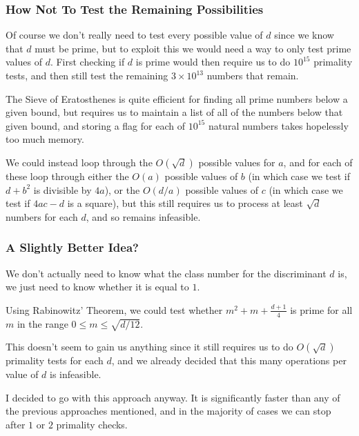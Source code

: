 \documentclass{beamer}
\begin{document}
\begin{frame}

	\frametitle{How Not To Test the Remaining Possibilities}

	Of course we don't really need to test every possible value of $d$ since we know that $d$ must be prime, but to exploit this we would need a way to only test prime values of $d$. First checking if $d$ is prime would then require us to do $10^{15}$ primality tests, and then still test the remaining $3 \times 10^{13}$ numbers that remain. \pause

	The Sieve of Eratosthenes is quite efficient for finding all prime numbers below a given bound, but requires us to maintain a list of all of the numbers below that given bound, and storing a flag for each of $10^{15}$ natural numbers takes hopelessly too much memory. \pause

	We could instead loop through the $O(\sqrt{d})$ possible values for $a$, and for each of these loop through either the $O(a)$ possible values of $b$ (in which case we test if $d + b^2$ is divisible by $4a$), or the $O(d/a)$ possible values of $c$ (in which case we test if $4ac - d$ is a square), but this still requires us to process at least $\sqrt{d}$ numbers for each $d$, and so remains infeasible.

\end{frame}

\begin{frame}

	\frametitle{A Slightly Better Idea?}

	We don't actually need to know what the class number for the discriminant $d$ is, we just need to know whether it is equal to $1$. \pause

	Using Rabinowitz' Theorem, we could test whether $m^2 + m + \frac{d + 1}{4}$ is prime for all $m$ in the range $0 \leq m \leq \sqrt{d/12}$. \pause

	This doesn't seem to gain us anything since it still requires us to do $O(\sqrt{d})$ primality tests for each $d$, and we already decided that this many operations per value of $d$ is infeasible. \pause

	I decided to go with this approach anyway. It is significantly faster than any of the previous approaches mentioned, and in the majority of cases we can stop after $1$ or $2$ primality checks.

\end{frame}
\end{document}
